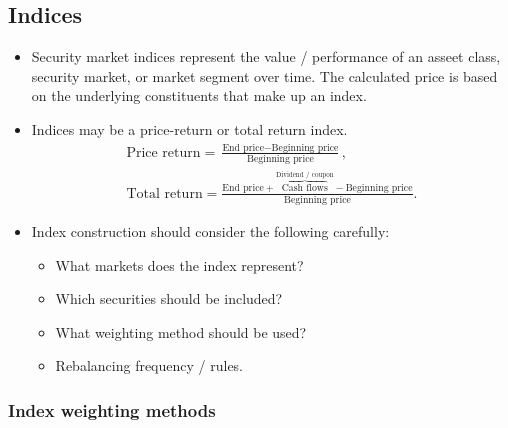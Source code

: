 \documentclass[../notes_compiled.tex]{subfiles}
\begin{document}
\subsection{Indices}

\begin{itemize}
\item Security market indices represent the value / performance of an asseet class, security market, or market segment over time. The calculated price is based on the underlying constituents that make up an index.
\item Indices may be a price-return or total return index.
\begin{gather}
\text{Price return} = \frac{\text{End price} - \text{Beginning price}}{\text{Beginning price}}, \\
\text{Total return} = \frac{\text{End price}+\overbrace{\text{Cash flows}}^{\text{Dividend / coupon}} - \text{Beginning price}}{\text{Beginning price}}.
\end{gather}

\item Index construction should consider the following carefully:
\begin{itemize}
\item What markets does the index represent?
\item Which securities should be included?
\item What weighting method should be used?
\item Rebalancing frequency / rules.
\end{itemize}
\end{itemize}


\subsubsection{Index weighting methods}
\end{document}

